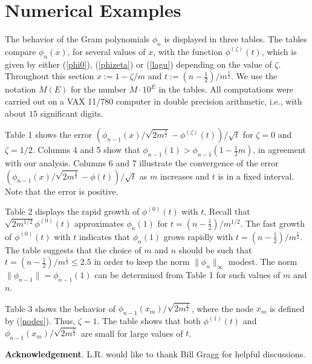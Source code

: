 \section{Numerical Examples}

The behavior of the Gram polynomials $\phi_{n}$ is displayed in three
tables. The tables compare $\phi_n(x)$, for several values of $x$, with
the function
$\phi^{(\zeta)}(t)$, which is given by either (\ref{phi0}), (\ref{phizeta}) or
(\ref{lagu}) depending on the value of $\zeta$. Throughout this section
$x:=1-\zeta/m$ and $t:=(n-\frac{1}{2})/m^\frac{1}{2}$. We use the
notation $M (E)$ for the number $M\cdot 10^E$ in the tables.
All computations were carried out on a VAX 11/780 computer in double
precision arithmetic, i.e., with about $15$ significant digits.

Table 1 shows the error
$(\phi_{n-1}(x)/\sqrt{2m^{\frac{1}{2}}} - \phi^{(\zeta)}(t))/\sqrt{t}$ for
$\zeta=0$ and $\zeta=1/2$. Columns 4 and 5 show that
$\phi_{n-1}(1)>\phi_{n-1}(1-\frac{1}{2}m)$, in agreement with our analysis.
Columns 6 and 7 illustrate the convergence of the error
$(\phi_{n-1}(x)/\sqrt{2m^{\frac{1}{2}}} - \phi(t))/\sqrt{t}$ as $m$
increases and $t$ is in a fixed interval. Note that the error is positive.

Table 2 displays the rapid growth of $\phi^{(0)}(t)$ with $t$. Recall that
$\sqrt{2m^{1/2}}\phi^{(0)}(t)$ approximates $\phi_n(1)$ for
$t=(n-\frac{1}{2})/m^{1/2}$. The fast growth of $\phi^{(0)}(t)$ with $t$
indicates that $\phi_n(1)$ grows rapidly with
$t=(n-\frac{1}{2})/m^{\frac{1}{2}}$.
The table suggests that the choice of $m$ and $n$ should be such that
$t=(n-\frac{1}{2})/m^{\frac{1}{2}} \leq 2.5$ in order to keep the norm
$\|\phi_n\|_\infty$ modest. The norm $\|\phi_{n-1}\|=\phi_{n-1}(1)$
can be determined from Table 1 for such values of $m$ and $n$.

Table 3 shows the behavior of $\phi_{n-1}(x_m)/\sqrt{2m^{\frac{1}{2}}}$,
where the node $x_m$ is defined by (\ref{nodes}). Thus, $\zeta=1$. The
table shows that both $\phi^{(1)} (t)$ and
$\phi_{n-1} (x_m) / \sqrt{2m^{\frac{1}{2}}}$ are small for large values of $t$.

\vskip10pt
\noindent
{\bf Acknowledgement}. L.R. would like to thank Bill Gragg for helpful
discussions.

